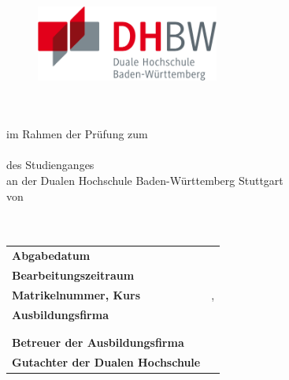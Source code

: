{
\begin{titlepage}
	\enlargethispage{4cm}
	\begin{figure}
		\begin{minipage}{0.49\textwidth}
			\flushleft
		\end{minipage}
		\hfill
		\begin{minipage}{0.49\textwidth}
			\flushright
			\includegraphics[height=2.5cm]{images/logos/dhbw.pdf} 
		\end{minipage}
	\end{figure} 
	\vspace*{0.1cm}
	\begin{center}
		\huge{\textbf{\titel}}\\[1.5cm]
		\Large{\textbf{\arbeit}}\\[0.5cm]
		\normalsize{im Rahmen der Prüfung zum\\[1ex] \textbf{\abschluss}}\\[0.5cm]
		\Large{des Studienganges \studiengang}\\[1ex]
		\normalsize{an der Dualen Hochschule Baden-Württemberg Stuttgart}\\[1cm]
		\normalsize{von}\\[1ex] \Large{\textbf{\vorname\,\nachname}} \\[1cm]
		\normalsize{\bearbeitungsmonat}\\[2.25cm]
		\begin{spacing}{0.8}
			\begin{tabular}{ll}
				\textbf{Abgabedatum}				\hspace{4.5cm}					& \abgabeDatum\\[0.2cm]
				\textbf{Bearbeitungszeitraum}       				&  \bearbeitungszeitraum\\[0.2cm]
				\textbf{Matrikelnummer, Kurs} 					   	&  \matrikelnr, \kurs\\[0.2cm]
				\textbf{Ausbildungsfirma}              					 &  \firmaName\\
																						& \firmaStrasse \\
																						& \firmaPlz\\[0.2cm]
				\textbf{Betreuer der Ausbildungsfirma}          &  \betreuerFirma\\[0.2cm]
				\textbf{Gutachter der Dualen Hochschule}    &  \betreuerDhbw\\[0.2cm]
			\end{tabular} 
		\end{spacing}
	\end{center}
\end{titlepage}
}